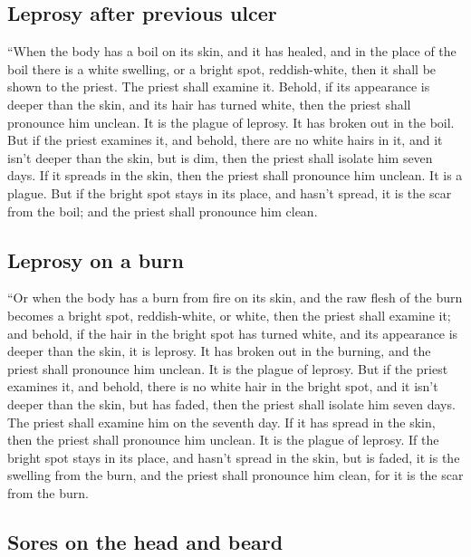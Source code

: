 \hypertarget{leprosy-after-previous-ulcer}{%
\subsection{Leprosy after previous
ulcer}\label{leprosy-after-previous-ulcer}}

 ``When the body has a boil on its skin, and it has
healed,  and in the place of the boil there is a white
swelling, or a bright spot, reddish-white, then it shall be shown to the
priest.  The priest shall examine it. Behold, if its
appearance is deeper than the skin, and its hair has turned white, then
the priest shall pronounce him unclean. It is the plague of leprosy. It
has broken out in the boil.  But if the priest examines
it, and behold, there are no white hairs in it, and it isn't deeper than
the skin, but is dim, then the priest shall isolate him seven days.
 If it spreads in the skin, then the priest shall
pronounce him unclean. It is a plague.  But if the bright
spot stays in its place, and hasn't spread, it is the scar from the
boil; and the priest shall pronounce him clean.

\hypertarget{leprosy-on-a-burn}{%
\subsection{Leprosy on a burn}\label{leprosy-on-a-burn}}

 ``Or when the body has a burn from fire on its skin, and
the raw flesh of the burn becomes a bright spot, reddish-white, or
white,  then the priest shall examine it; and behold, if
the hair in the bright spot has turned white, and its appearance is
deeper than the skin, it is leprosy. It has broken out in the burning,
and the priest shall pronounce him unclean. It is the plague of leprosy.
 But if the priest examines it, and behold, there is no
white hair in the bright spot, and it isn't deeper than the skin, but
has faded, then the priest shall isolate him seven days. 
The priest shall examine him on the seventh day. If it has spread in the
skin, then the priest shall pronounce him unclean. It is the plague of
leprosy.  If the bright spot stays in its place, and
hasn't spread in the skin, but is faded, it is the swelling from the
burn, and the priest shall pronounce him clean, for it is the scar from
the burn.

\hypertarget{sores-on-the-head-and-beard}{%
\subsection{Sores on the head and
beard}\label{sores-on-the-head-and-beard}}

